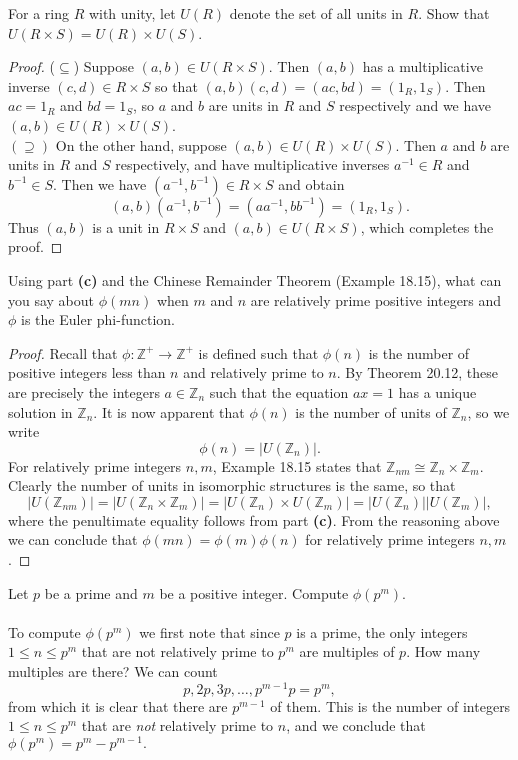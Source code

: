\documentclass{article}
\newenvironment{problem2}[1]{\noindent {\bf (#1}}
{\medskip}
\begin{document}
\begin{problem2}{c)} For a ring $R$ with unity, let $U(R)$ denote the set of all units in $R$. Show that $U(R\times S)=U(R)\times U(S)$.
\begin{proof} ($\subseteq$) Suppose $(a,b)\in U(R\times S)$. Then $(a,b)$ has a multiplicative inverse $(c,d)\in R\times S$ so that $(a,b)(c,d)=(ac,bd)=(1_R,1_S)$. Then $ac=1_R$ and $bd=1_S$, so $a$ and $b$ are units in $R$ and $S$ respectively and we have $(a,b)\in U(R)\times U(S)$.\\
$(\supseteq)$ On the other hand, suppose $(a,b)\in U(R)\times U(S).$ Then $a$ and $b$ are units in $R$ and $S$ respectively, and have  multiplicative inverses $a^{-1}\in R$ and $b^{-1}\in S$. Then we have $(a^{-1},b^{-1})\in R\times S$ and obtain $$(a,b)(a^{-1},b^{-1})=(aa^{-1},bb^{-1})=(1_R,1_S).$$ Thus $(a,b)$ is a unit in $R\times S$ and $(a,b)\in U(R\times S)$, which completes the proof.
\end{proof}
\end{problem2}


\begin{problem2}{d)} Using part \textbf{(c)} and the Chinese Remainder Theorem (Example 18.15), what can you say about $\phi(mn)$ when $m$ and $n$ are relatively prime positive integers and $\phi$ is the Euler phi-function.
\begin{proof} Recall that $\phi:\mathbb{Z}^+\to\mathbb{Z}^+$ is defined such that $\phi(n)$ is the number of positive integers less than $n$ and relatively prime to $n$. By Theorem 20.12, these are precisely the integers $a\in \mathbb{Z}_n$ such that the equation $ax=1$ has a unique solution in $\mathbb{Z}_n$. It is now apparent that $\phi(n)$ is the number of units of $\mathbb{Z}_n$, so we write $$\phi(n)=\big|U(\mathbb{Z}_n)\big|.$$ For relatively prime integers $n,m$, Example 18.15 states that $\mathbb{Z}_{nm}\cong \mathbb{Z}_n\times\mathbb{Z}_m$. Clearly the number of units in isomorphic structures is the same, so that $$|U(\mathbb{Z}_{nm})|=|U(\mathbb{Z}_n\times\mathbb{Z}_m)|=|U(\mathbb{Z}_n)\times U(\mathbb{Z}_m)|=|U(\mathbb{Z}_n)||U(\mathbb{Z}_m)|,$$ where the penultimate equality follows from part \textbf{(c)}. From the reasoning above we can conclude that $\phi(mn)=\phi(m)\phi(n)$ for relatively prime integers $n,m$.
\end{proof}
\end{problem2}


\begin{problem2}{e)} Let $p$ be a prime and $m$ be a positive integer. Compute $\phi(p^m).$\\\\
To compute $\phi(p^m)$ we first note that since $p$ is a prime, the only integers $1\le n\le p^m$ that are not relatively prime to $p^m$ are multiples of $p$. How many multiples are there? We can count $$p,2p,3p,\ldots,p^{m-1}p=p^m,$$ from which it is clear that there are $p^{m-1}$ of them. This is the number of integers $1\le n \le p^m$ that are \emph{not} relatively prime to $n$, and we conclude that $\phi(p^m)=p^m-p^{m-1}.$
\end{problem2}
\end{document}
